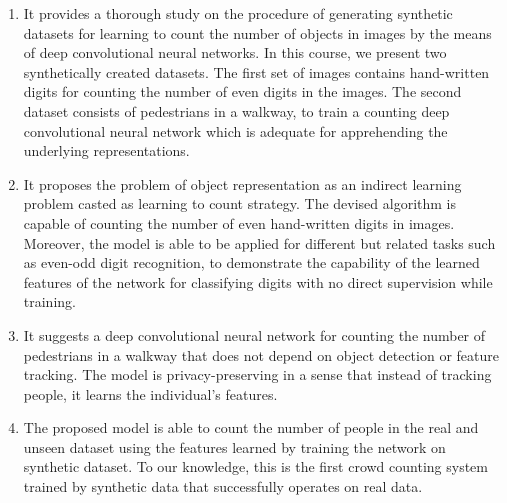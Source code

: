 \begin{enumerate}
	
	\item It provides a thorough study on the procedure of generating synthetic datasets for learning to count the number of objects in images by the means of deep convolutional neural networks. In this course, we present two synthetically created datasets. The first set of images contains hand-written digits for counting the number of even digits in the images. The second dataset consists of pedestrians in a walkway, to train a counting deep convolutional neural network which is adequate for apprehending the underlying representations.
	
	
	\item It proposes the problem of object representation as an indirect learning problem casted as learning to count strategy. The devised algorithm is capable of counting the number of even hand-written digits in images. Moreover, the model is able to be applied for different but related tasks such as even-odd digit recognition, to demonstrate the capability of the learned features of the network for classifying digits with no direct supervision while training. 
	
	\item It suggests a deep convolutional neural network for counting the number of pedestrians in a walkway that does not depend on object detection or feature tracking. The model is privacy-preserving in a sense that instead of tracking people, it learns the individual's features.
	 

	\item The proposed model is able to count the number of people in the real and unseen dataset using the features learned by training the network on synthetic dataset. To our knowledge, this is the first crowd counting system trained by synthetic data that successfully operates on real data. 


\end{enumerate}
